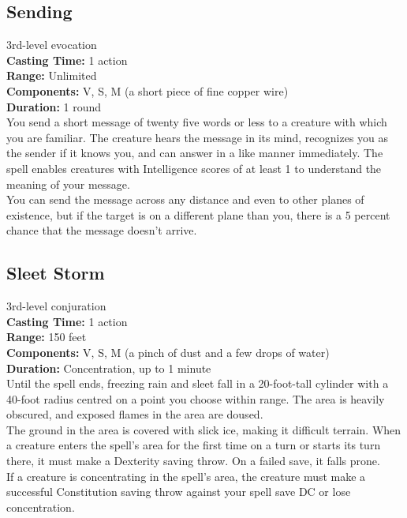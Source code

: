\documentclass[11pt, A4paper, english]{article}
\begin{document}
		\subsection{Sending}
3rd-level evocation \\
\textbf{Casting Time:} 1 action \\
\textbf{Range:} Unlimited \\
\textbf{Components:} V, S, M (a short piece of fine copper wire) \\
\textbf{Duration:} 1 round \\
You send a short message of twenty five words or less to a creature with which you are familiar. The creature hears the message in its mind, recognizes you as the sender if it knows you, and can answer in a like manner immediately. The spell enables creatures with Intelligence scores of at least 1 to understand the meaning of your message. \\
You can send the message across any distance and even to other planes of existence, but if the target is on a different plane than you, there is a 5 percent chance that the message doesn't arrive.

		\subsection{Sleet Storm}
3rd-level conjuration \\
\textbf{Casting Time:} 1 action \\
\textbf{Range:} 150 feet \\
\textbf{Components:} V, S, M (a pinch of dust and a few drops of water) \\
\textbf{Duration:} Concentration, up to 1 minute \\
Until the spell ends, freezing rain and sleet fall in a 20-foot-tall cylinder with a 40-foot radius centred on a point you choose within range. The area is heavily obscured, and exposed flames in the area are doused. \\
The ground in the area is covered with slick ice, making it difficult terrain. When a creature enters the spell's area for the first time on a turn or starts its turn there, it must make a Dexterity saving throw. On a failed save, it falls prone. \\
If a creature is concentrating in the spell's area, the creature must make a successful Constitution saving throw against your spell save DC or lose concentration.
\end{document}
